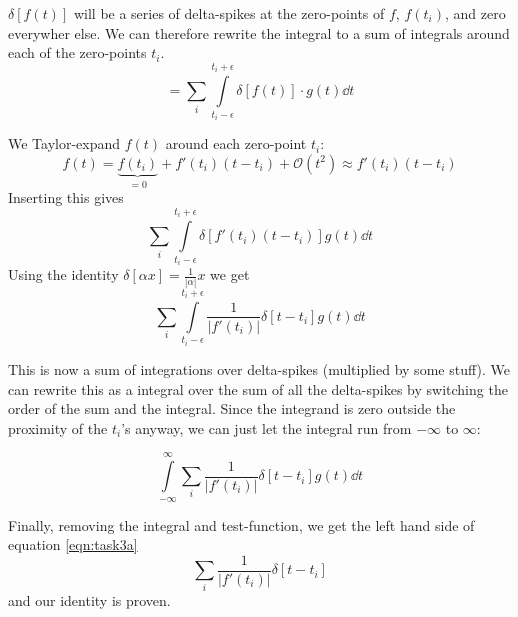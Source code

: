 \documentclass[10pt,a4paper]{article}
\newcommand{\infint}{\int\limits_{-\infty}^{\infty}}
\begin{document}
$\delta[f(t)]$ will be a series of delta-spikes at the zero-points of $f$, $f(t_i)$, and zero everywher else. We can therefore rewrite the integral to a sum of integrals around each of the zero-points $t_i$.
\begin{equation}
    = \sum_i \int\limits_{t_i - \epsilon}^{t_i+\epsilon} \delta[f(t)]\cdot g(t) \dd{t}
\end{equation}

We Taylor-expand $f(t)$ around each zero-point $t_i$:
\begin{equation}
    f(t) = \underbrace{f(t_i)}_{=0} + f'(t_i)(t-t_i) + \mathcal{O}(t^2) \approx f'(t_i)(t-t_i)
\end{equation}
Inserting this gives
\begin{equation}
    \sum_i \int\limits_{t_i - \epsilon}^{t_i+\epsilon} \delta[f'(t_i)(t-t_i)]g(t)\dd{t}
\end{equation}
Using the identity $\delta[\alpha x] = \frac{1}{|\alpha|}x$ we get
\begin{equation}
    \sum_i \int\limits_{t_i - \epsilon}^{t_i+\epsilon} \frac{1}{|f'(t_i)|}\delta[t-t_i]g(t)\dd{t}
\end{equation}

This is now a sum of integrations over delta-spikes (multiplied by some stuff). We can rewrite this as a integral over the sum of all the delta-spikes by switching the order of the sum and the integral. Since the integrand is zero outside the proximity of the $t_i$'s anyway, we can just let the integral run from $-\infty$ to $\infty$:

\begin{equation}
    \infint \sum_i \frac{1}{|f'(t_i)|}\delta[t-t_i]g(t)\dd{t}
\end{equation}


Finally, removing the integral and test-function, we get the left hand side of equation \ref{eqn:task3a}
\begin{equation}
    \sum_i \frac{1}{|f'(t_i)|} \delta[t-t_i]
\end{equation}
and our identity is proven.
\end{document}
